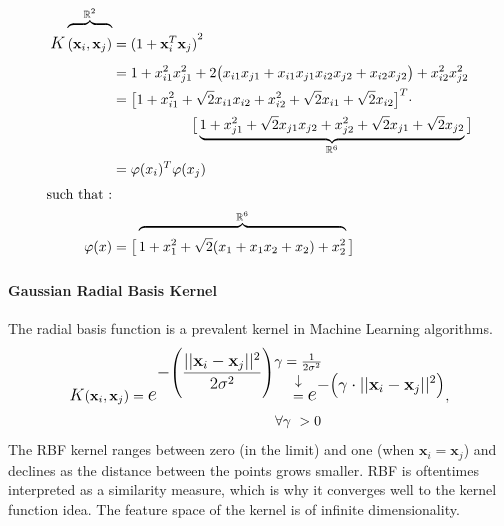 	\begin{equation}
		\begin{split}
			\mathlarger{K} \xoverbrace{(\textbf{x}_i,\textbf{x}_j)}^{\mathbb{R}^2}
			&= {(1 + \textbf{x}_i^T \textbf{x}_j)}^2 \\
			& = 1+ x_{i1}^2 x_{j1}^2 
			+ 2 \big(x_{i1}x_{j1} +  x_{i1}x_{j1}x_{i2}x_{j2} + x_{i2}x_{j2}\big) 
			+ x_{i2}^2 x_{j2}^2 \\ 
			& = \big[
				1 + x_{i1}^2 + \sqrt{2}x_{i1}x_{i2} + x_{i2}^2 + \sqrt{2}x_{i1} + \sqrt{2}x_{i2}
			\big]^T
			\cdot \\
			&\hspace{2cm} \big[
				\underbrace{1 + x_{j1}^2 + \sqrt{2}x_{j1}x_{j2} + x_{j2}^2 + \sqrt{2}x_{j1} + \sqrt{2}x_{j2}}_{\mathbb{R}^6}
			\big] \\
			&= \varphi(x_i)^T\varphi(x_j) \\ 
			\text{such that :}&\\
			 \varphi(x) &= \big[
				 \xoverbrace{1 + x_1^2  + \sqrt{2}(x_1 + x_1x_2 + x_2) + x_2^2}^{\mathbb{R}^6}
			 \big]
		\end{split}
		\raisetag{2\normalbaselineskip}
		\label{svm_poly_kernal_proof}
	\end{equation}
	
\paragraph{Gaussian Radial Basis Kernel}
	The radial basis function is a prevalent kernel in Machine Learning algorithms.
	\begin{equation}
		 \begin{aligned}
			\mathlarger{K}(\textbf{x}_i,\textbf{x}_j) = \mathlarger{\mathlarger{e}}^{
				\displaystyle  -\Bigg(
				\frac{||\textbf{x}_i - \textbf{x}_j||^2}{2 \sigma^2}
				\Bigg)}& \ \ \
			\overset{\mathclap{\tikz \node {$\downarrow$} node [above=1ex] {$\gamma = \frac{1}{2\sigma^2}$};}}{=}
			\mathlarger{\mathlarger{e}}^{\displaystyle  -\big(
				\gamma \cdot ||\textbf{x}_i - \textbf{x}_j||^2
				\big)}, \\
			& \forall \gamma \ > 0 
		 \end{aligned}
	\end{equation}
	The RBF kernel ranges between zero (in the limit) and one (when $\textbf{x}_i = \textbf{x}_j$) and declines as the distance between the points grows smaller. RBF is oftentimes interpreted as a similarity measure, which is why it converges well to the kernel function idea. The feature space of the kernel is of infinite dimensionality.
	
